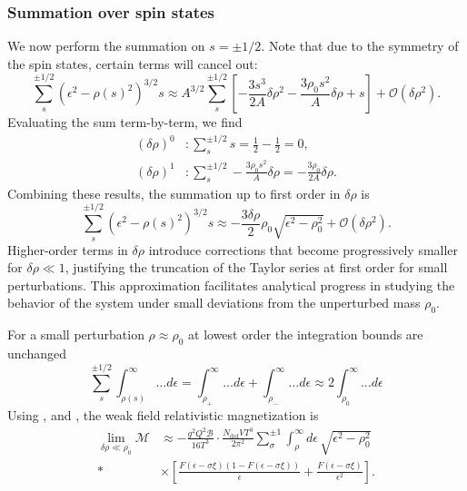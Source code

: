 \subsubsection{Summation over spin states}
We now perform the summation on \(s = \pm1/2\). Note that due to the symmetry of the spin states, certain terms will cancel out:
\begin{equation}
\sum_{s}^{\pm1/2} \left( \epsilon^{2} - \rho(s)^{2} \right)^{3/2} s \approx A^{3/2} \sum_{s}^{\pm1/2} \left[ -\frac{3 s^3}{2 A}\delta \rho ^2 - \frac{3 \rho _0 s^2}{A}\delta \rho + s \right] + \mathcal{O}(\delta\rho^{2}).
\end{equation}
Evaluating the sum term-by-term, we find
\begin{align}
(\delta\rho)^{0}&:\sum_{s}^{\pm1/2} s = \frac{1}{2} - \frac{1}{2} = 0,\\
(\delta\rho)^{1}&:\sum_{s}^{\pm1/2} - \frac{3 \rho _0 s^2}{A}\delta \rho = -\frac{3 \rho _0}{2 A}\delta \rho.
\end{align}
Combining these results, the summation up to first order in \(\delta\rho\) is
\begin{equation}
\label{eq:spin_summation_perturbation}
\sum_{s}^{\pm1/2} \left( \epsilon^{2} - \rho(s)^{2} \right)^{3/2} s \approx -\frac{3\delta \rho}{2} \rho _0 \sqrt{\epsilon ^2-\rho _0^2} + \mathcal{O}(\delta\rho^{2}).
\end{equation}
Higher-order terms in \(\delta\rho\) introduce corrections that become progressively smaller for \(\delta\rho \ll 1\), justifying the truncation of the Taylor series at first order for small perturbations. This approximation facilitates analytical progress in studying the behavior of the system under small deviations from the unperturbed mass \(\rho_{0}\).

For a small perturbation \(\rho\approx\rho_{0}\) at lowest order the integration bounds are unchanged
\begin{equation}
    \sum_{s}^{\pm1/2} \int^{\infty}_{\rho(s)} \ldots d\epsilon = \int^{\infty}_{\rho_{+}} \ldots d\epsilon + \int^{\infty}_{\rho_{-}} \ldots d\epsilon \approx 2\int^{\infty}_{\rho_{0}} \ldots d\epsilon
\end{equation}
Using ,  and , the weak field relativistic magnetization is
\begin{align}
    \label{eq:mag_form_weak}
    \lim_{\delta\rho\ll\rho_{0}}\mathcal{M} &\approx -\frac{g^2 Q^2 \mathcal{B}}{16 T^3}\cdot\frac{ N_{\mathrm{dof}} V T^{3}}{2\pi^{2}} \sum_{\sigma}^{\pm1} \int_{\rho}^{\infty} d\epsilon \, \sqrt{\epsilon ^2-\rho _0^2} \\*
    &\times\left[ \frac{F(\epsilon - \sigma\xi)\left(1 - F(\epsilon - \sigma\xi)\right)}{\epsilon} + \frac{F(\epsilon - \sigma\xi)}{\epsilon^{2}} \right].
\end{align}
